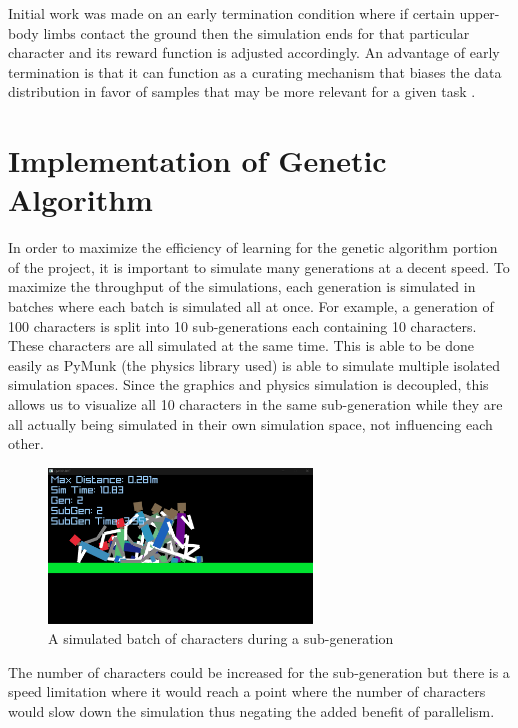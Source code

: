 \documentclass[letterpaper]{article} %
\begin{document}
\par Initial work was made on an early termination condition where if certain upper-body limbs contact the ground then the simulation ends for that particular character and its reward function is adjusted accordingly. An advantage of early termination is that it can function as a curating mechanism that biases the data distribution in favor of samples that may be more relevant for a given task \cite{2018-TOG-deepMimic}.

\section{Implementation of Genetic Algorithm}

In order to maximize the efficiency of learning for the genetic algorithm portion of the project, it is important to simulate many generations at a decent speed. To maximize the throughput of the simulations, each generation is simulated in batches where each batch is simulated all at once. For example, a generation of 100 characters is split into 10 sub-generations each containing 10 characters. These characters are all simulated at the same time. This is able to be done easily as PyMunk (the physics library used) is able to simulate multiple isolated simulation spaces. Since the graphics and physics simulation is decoupled, this allows us to visualize all 10 characters in the same sub-generation while they are all actually being simulated in their own simulation space, not influencing each other.

\begin{figure}[h]
\caption{A simulated batch of characters during a sub-generation}
\centering
\includegraphics[width=7cm]{many.png}
\end{figure}

\par The number of characters could be increased for the sub-generation but there is a speed limitation where it would reach a point where the number of characters would slow down the simulation thus negating the added benefit of parallelism.
\end{document}
